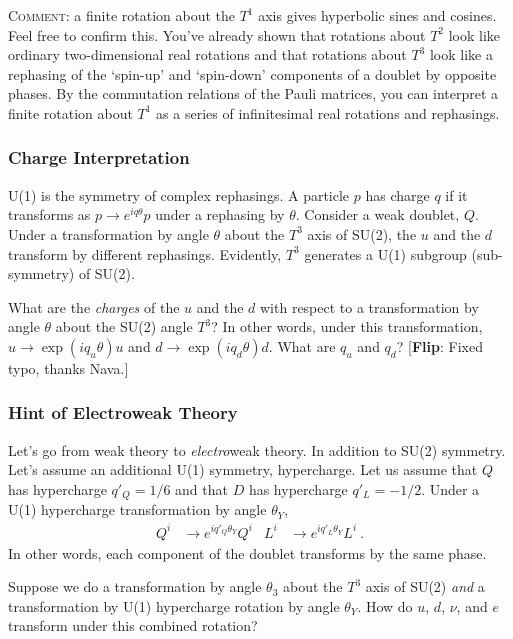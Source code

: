 \documentclass[12pt]{article}
\newcommand{\flip}[1]{{\color{red} [\textbf{Flip}: {#1}]}}
\begin{document}
\textsc{Comment}: a finite rotation about the $T^1$ axis gives hyperbolic sines and cosines. Feel free to confirm this. You've already shown that rotations about $T^2$ look like ordinary two-dimensional real rotations and that rotations about $T^3$ look like a rephasing of the `spin-up' and `spin-down' components of a doublet by opposite phases. By the commutation relations of the Pauli matrices, you can interpret a finite rotation about $T^1$ as a series of infinitesimal real rotations and rephasings.

\subsubsection{Charge Interpretation}

U(1) is the symmetry of complex rephasings. A particle $p$ has charge $q$ if it transforms as $p \to e^{iq\theta} p$ under a rephasing by $\theta$. Consider a weak doublet, $Q$. Under a transformation by angle $\theta$ about the $T^3$ axis of SU(2), the $u$ and the $d$ transform by different rephasings. Evidently, $T^3$ generates a U(1) subgroup (sub-symmetry) of SU(2).

What are the \emph{charges} of the $u$ and the $d$ with respect to a transformation by angle $\theta$ about the SU(2) angle $T^3$? In other words, under this transformation, $u\to \exp(iq_u \theta) u$ and $d\to \exp(iq_d \theta) d$. What are $q_u$ and $q_d$? \flip{Fixed typo, thanks Nava.}

\subsubsection{Hint of Electroweak Theory}

Let's go from weak theory to \emph{electro}weak theory. In addition to SU(2) symmetry. Let's assume an additional U(1) symmetry, hypercharge. Let us assume that $Q$ has hypercharge $q'_Q = 1/6$ and that $D$ has hypercharge $q'_L = -1/2$. Under a U(1) hypercharge transformation by angle $\theta_Y$,
\begin{align}
	Q^i &\to e^{iq'_Q \theta_Y} Q^i
	&
	L^i &\to e^{iq'_L \theta_Y} L^i \ .
\end{align}
In other words, each component of the doublet transforms by the same phase. 

Suppose we do a transformation by angle $\theta_3$ about the $T^3$ axis of SU(2) \emph{and} a transformation by U(1) hypercharge rotation by angle $\theta_Y$. How do $u$, $d$, $\nu$, and $e$ transform under this combined rotation?
\end{document}
